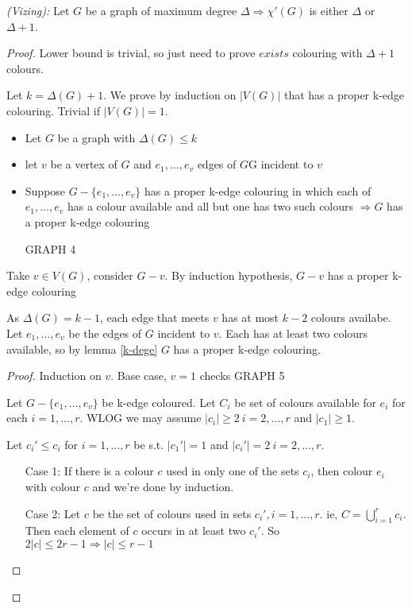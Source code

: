 \documentclass{article}
\begin{document}
\begin{thm}
\emph{(Vizing):}  Let $G$ be a graph of maximum degree $\Delta \Rightarrow \chi'(G)$ is either $\Delta$ or $\Delta +1$.
\end{thm}

\begin{proof}
Lower bound is trivial, so just need to prove $exists$ colouring with $\Delta+1$ colours.

Let $k = \Delta(G)+1$.  We prove by induction on $|V(G)|$ that has a proper k-edge colouring.  Trivial if $|V(G)|=1$.

\begin{lem}
\label{k-edge}
\begin{itemize}
\item Let $G$ be a graph with $\Delta(G) \le k$
\item let $v$ be a vertex of $G$ and $e_1, \dots, e_v$ edges of $G$G incident to $v$
\item Suppose $G - \{e_1,\dots,e_v\}$ has a proper k-edge colouring in which each of $e_1,\dots,e_v$ has a colour available and all but one has two such colours $\Rightarrow G$ has a proper k-edge colouring

GRAPH 4
\end{itemize}
\end{lem}

Take $v \in V(G)$, consider $G-v$. By induction hypothesis, $G-v$ has a proper k-edge colouring

As $\Delta(G) = k-1$, each edge that meets $v$ has at most  $k-2$ colours availabe.  Let $e_1, \dots,e_v$ be the edges of $G$ incident to $v$.  Each has at least two colours available, so by lemma \ref{k-dege} $G$ has a proper k-edge colouring.

\begin{proof}
Induction on $v$.  Base case, $v=1$ checks GRAPH 5

Let $G- \{e_1, \dots, e_v \}$ be k-edge coloured.  Let $C_i$ be set of colours available for $e_i$ for each $i=1, \dots,r$.  WLOG we may assume $|c_i| \ge 2 ~ i = 2, \dots, r$  and $|c_1| \ge 1$.

Let $c_i' \le c_i$ for $i = 1, \dots, r$ be s.t. $|c_1'| =1$  and $|c_i'|=2 ~ i = 2, \dots, r$.

\begin{itemize}
\item[Case 1:] If there is a colour $c$ used in only one of the sets $c_i$, then colour $e_i$ with colour $c$ and we're done by induction. 
\item[Case 2:] Let $c$ be the set of colours used in sets $c_i', i=1, \dots, r$.  ie, $C=\displaystyle \bigcup_{i=1}^r c_i$.  Then each element of $c$ occurs in at least two $c_i'$.  So $2|c| \le 2r-1 \Rightarrow |c| \le r-1$
\end{itemize}





\end{proof}
\end{proof}
\end{document}
